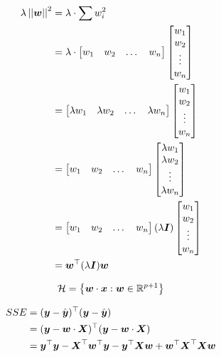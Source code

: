 \documentclass[12pt]{article}
\begin{document}
\begin{enumerate}
$$ \begin{aligned} \lambda \left|\left|\boldsymbol{w}\right|\right|^2 &= \lambda \cdot  \sum w_i^2 \\ &= \lambda \cdot \begin{bmatrix} w_1 & w_2 & \dots & w_n \end{bmatrix} \begin{bmatrix} w_1 \\ w_2 \\ \vdots \\ w_n \end{bmatrix} \\ &= \begin{bmatrix} \lambda w_1 & \lambda w_2 & \dots & \lambda w_n \end{bmatrix} \begin{bmatrix} w_1 \\ w_2 \\ \vdots \\ w_n \end{bmatrix} \\ &= \begin{bmatrix} w_1 & w_2 & \dots & w_n \end{bmatrix} \begin{bmatrix} \lambda w_1 \\ \lambda w_2 \\ \vdots \\ \lambda w_n \end{bmatrix} \\ &= \begin{bmatrix} w_1 & w_2 & \dots & w_n \end{bmatrix} (\lambda  \boldsymbol{I}) \begin{bmatrix} w_1 \\ w_2 \\ \vdots \\ w_n \end{bmatrix} \\ &= \boldsymbol{w}^\top (\lambda \boldsymbol{I}) \boldsymbol{w} \end{aligned} $$ 

$$ \mathcal{H} = \left\{ \boldsymbol{w} \cdot \boldsymbol{x}: \boldsymbol{w} \in \mathbb{R}^{p+1}\right\} $$ 

$$ \begin{aligned} SSE &= (\boldsymbol{y} - \hat{\boldsymbol{y}})^\top(\boldsymbol{y} - \hat{\boldsymbol{y}}) \\ &= (\boldsymbol{y} - \boldsymbol{w} \cdot \boldsymbol{X})^\top (\boldsymbol{y} - \boldsymbol{w} \cdot \boldsymbol{X}) \\ &= \boldsymbol{y}^\top\boldsymbol{y} - \boldsymbol{X}^\top\boldsymbol{w}^\top\boldsymbol{y} - \boldsymbol{y}^\top\boldsymbol{X}\boldsymbol{w} + \boldsymbol{w}^\top\boldsymbol{X}^\top\boldsymbol{X}\boldsymbol{w} \end{aligned} $$ 


\end{enumerate}
\end{document}
